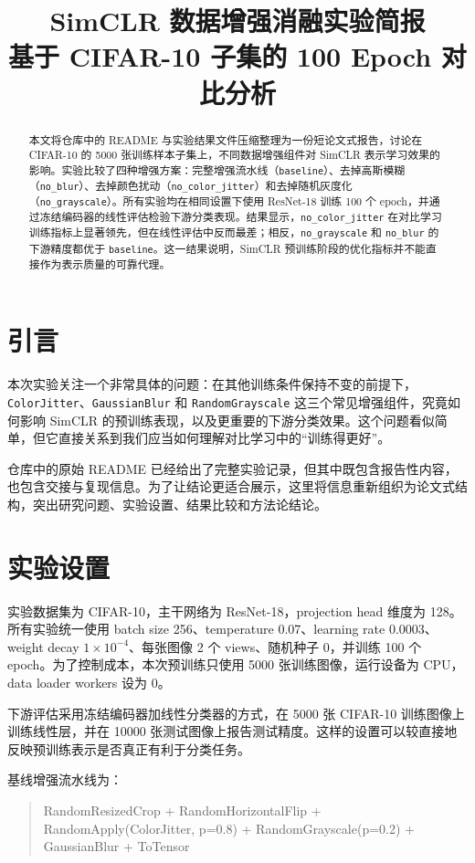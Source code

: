 \documentclass[11pt,a4paper,fontset=fandol]{ctexart}
\title{\textbf{SimCLR 数据增强消融实验简报}\\
\large 基于 CIFAR-10 子集的 100 Epoch 对比分析}
\author{}
\date{}
\begin{document}
\maketitle
\thispagestyle{empty}

\begin{abstract}
本文将仓库中的 README 与实验结果文件压缩整理为一份短论文式报告，讨论在 CIFAR-10 的 5000 张训练样本子集上，不同数据增强组件对 SimCLR 表示学习效果的影响。实验比较了四种增强方案：完整增强流水线（\texttt{baseline}）、去掉高斯模糊（\texttt{no\_blur}）、去掉颜色扰动（\texttt{no\_color\_jitter}）和去掉随机灰度化（\texttt{no\_grayscale}）。所有实验均在相同设置下使用 ResNet-18 训练 100 个 epoch，并通过冻结编码器的线性评估检验下游分类表现。结果显示，\texttt{no\_color\_jitter} 在对比学习训练指标上显著领先，但在线性评估中反而最差；相反，\texttt{no\_grayscale} 和 \texttt{no\_blur} 的下游精度都优于 \texttt{baseline}。这一结果说明，SimCLR 预训练阶段的优化指标并不能直接作为表示质量的可靠代理。
\end{abstract}

\section{引言}
本次实验关注一个非常具体的问题：在其他训练条件保持不变的前提下，\texttt{ColorJitter}、\texttt{GaussianBlur} 和 \texttt{RandomGrayscale} 这三个常见增强组件，究竟如何影响 SimCLR 的预训练表现，以及更重要的下游分类效果。这个问题看似简单，但它直接关系到我们应当如何理解对比学习中的“训练得更好”。

仓库中的原始 README 已经给出了完整实验记录，但其中既包含报告性内容，也包含交接与复现信息。为了让结论更适合展示，这里将信息重新组织为论文式结构，突出研究问题、实验设置、结果比较和方法论结论。

\section{实验设置}
实验数据集为 CIFAR-10，主干网络为 ResNet-18，projection head 维度为 128。所有实验统一使用 batch size 256、temperature 0.07、learning rate 0.0003、weight decay $1\times10^{-4}$、每张图像 2 个 views、随机种子 0，并训练 100 个 epoch。为了控制成本，本次预训练只使用 5000 张训练图像，运行设备为 CPU，data loader workers 设为 0。

下游评估采用冻结编码器加线性分类器的方式，在 5000 张 CIFAR-10 训练图像上训练线性层，并在 10000 张测试图像上报告测试精度。这样的设置可以较直接地反映预训练表示是否真正有利于分类任务。

基线增强流水线为：
\begin{quote}
\small\ttfamily
RandomResizedCrop + RandomHorizontalFlip +\\
RandomApply(ColorJitter, p=0.8) + RandomGrayscale(p=0.2) +\\
GaussianBlur + ToTensor
\end{quote}
\end{document}
